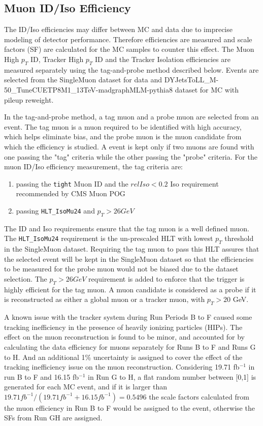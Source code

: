 \subsection{Muon ID/Iso Efficiency}
The ID/Iso efficiencies may differ between MC and data due to imprecise modeling of detector performance. Therefore efficiencies are measured and scale factors (SF) are calculated for the MC samples to counter this effect. The Muon High $p_T$ ID, Tracker High $p_T$ ID and the Tracker Isolation efficiencies are measured separately using the tag-and-probe method described below. Events are selected from the SingleMuon dataset for data and DYJetsToLL\_M-50\_TuneCUETP8M1\_13TeV-madgraphMLM-pythia8 dataset for MC with pileup reweight. 

\vspace{0.3cm}
In the tag-and-probe method, a tag muon and a probe muon are selected from an event. The tag muon is a muon required to be identified with high accuracy, which helps eliminate bias, and the probe muon is the muon candidate from which the efficiency is studied. A event is kept only if two muons are found with one passing the "tag" criteria while the other passing the "probe" criteria. For the muon ID/Iso efficiency measurement, the tag criteria are:
\begin{enumerate}
\item passing the \texttt{tight} Muon ID and the $relIso<0.2$ Iso requirement recommended by CMS Muon POG
\item passing \texttt{HLT\_IsoMu24} and $p_T > 26 GeV$
\end{enumerate}

The ID and Iso requirements ensure that the tag muon is a well defined muon. The \texttt{HLT\_IsoMu24} requirement is the un-prescaled HLT with lowest $p_T$ threshold in the SingleMuon dataset. Requiring the tag muon to pass this HLT assures that the selected event will be kept in the SingleMuon dataset so that the efficiencies to be measured for the probe muon would not be biased due to the dataset selection. The $p_T > 26 GeV$ requirement is added to enforce that the trigger is highly efficient for the tag muon. A muon candidate is considered as a probe if it is reconstructed as either a global muon or a tracker muon, with $p_T > 20$ GeV.

\vspace{0.3cm}
A known issue with the tracker system during Run Periods B to F caused some tracking inefficiency in the presence of heavily ionizing particles (HIPs). The effect on the muon reconstruction is found to be minor, and accounted for by calculating the data efficiency for muons separately for Runs B to F and Runs G to H. And an additional 1\% uncertainty is assigned to cover the effect of the tracking inefficiency issue on the muon reconstruction. Considering 19.71 fb$^{-1}$ in run B to F and 16.15 fb$^{-1}$ in Run G to H, a flat random number between [0,1] is generated for each MC event, and if it is larger than $19.71 fb^{-1}/(19.71 fb^{-1}+16.15 fb^{-1})=0.5496$ the scale factors calculated from the muon efficiency in Run B to F would be assigned to the event, otherwise the SFs from Run GH are assigned.

